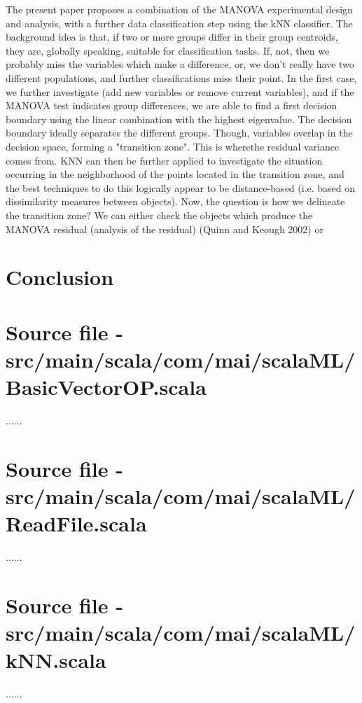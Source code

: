 \documentclass[journal]{IEEEtran}
\begin{document}
The present paper proposes a combination of the MANOVA experimental design and analysis, with a further data classification step using the kNN classifier. 
The background idea is that, if two or more groups differ in their group centroids, they are, globally speaking, suitable for classification tasks. If, not, then we probably miss the variables which make a difference, or, we don't really have two different populations, and further classifications miss their point.
In the first case, we further investigate (add new variables or remove current variables), and if the MANOVA test indicates group differences, we are able to find a first decision boundary using the linear combination with the highest eigenvalue. The decision boundary ideally separates the different groups. Though, variables overlap in the decision space, forming a "transition zone". This is wherethe residual variance comes from. KNN can then be further applied to investigate the situation occurring in the neighborhood of the points located in the transition zone, and the best techniques to do this logically appear to be distance-based (i.e. based on dissimilarity measures between objects). Now, the question is how we delineate the transition zone? We can either check the objects which produce the MANOVA residual (analysis of the residual) (Quinn and Keough 2002) or        

\section{Conclusion}



\appendices
\section{Source file - src/main/scala/com/mai/scalaML/BasicVectorOP.scala}

......

\section{Source file - src/main/scala/com/mai/scalaML/ReadFile.scala}

......

\section{Source file - src/main/scala/com/mai/scalaML/kNN.scala}

......
\end{document}
